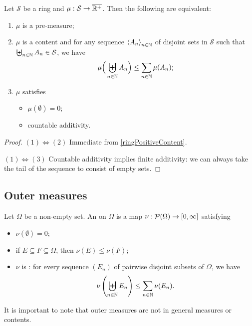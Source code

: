 \begin{lemma}
Let $\mathcal{S}$ be a ring and $\mu: \mathcal{S} \to \overline{\mathbb{R}^+}$. Then the following are equivalent:
\begin{enumerate}
\item $\mu$ is a pre-measure;
\item $\mu$ is a content and for any sequence $\left\langle A_n \right\rangle_{n\in \mathbb{N}}$ of disjoint sets in $\mathcal{S}$ such that $\biguplus_{n\in\mathbb{N}}A_n \in \mathcal{S}$, we have
\[ \mu\Big(\biguplus_{n\in\mathbb{N}}A_n\Big) \leq \sum_{n\in\mathbb{N}}\mu(A_n); \]
\item $\mu$ satisfies
\begin{itemize}
\item $\mu(\emptyset) = 0$;
\item countable additivity.
\end{itemize}
\end{enumerate}
\end{lemma}
\begin{proof}
$(1) \Leftrightarrow (2)$ Immediate from \ref{ringPositiveContent}.

$(1) \Leftrightarrow (3)$ Countable additivity implies finite additivity: we can always take the tail of the sequence to consist of empty sets.
\end{proof}


\subsection{Outer measures}
\begin{definition}
Let $\Omega$ be a non-empty set. An  on $\Omega$ is a map $\nu: \operatorname{\mathcal{P}}(\Omega)\to [0,\infty]$ satisfying
\begin{itemize}
\item $\nu(\emptyset) = 0$;
\item if $E\subseteq F\subseteq \Omega$, then $\nu(E)\leq \nu(F)$;
\item $\nu$ is : for every sequence $(E_n)$ of pairwise disjoint subsets of $\Omega$, we have
\[ \nu\left(\biguplus_{n\in\mathbb{N}}E_n\right) \leq \sum_{n\in\mathbb{N}}\nu(E_n). \]
\end{itemize}
\end{definition}
It is important to note that outer measures are not in general measures or contents.



